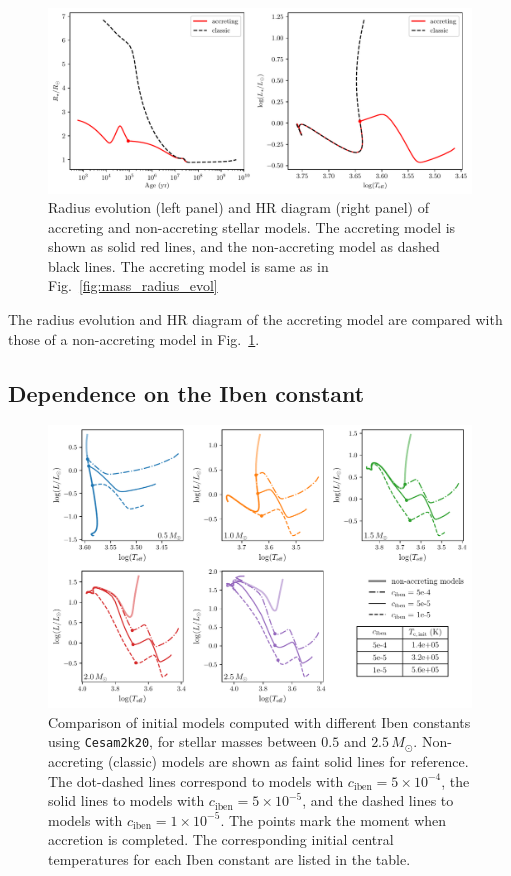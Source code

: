 \documentclass[12pt,a4paper]{article}
\newcommand{\mr}{\mathrm}
\begin{document}
\begin{figure}
  \centering
  \includegraphics[width=\textwidth,keepaspectratio]{m1_cmp_acc.pdf}
  \caption{Radius evolution (left panel) and HR diagram (right panel) of accreting and non-accreting stellar models. The accreting model is shown as solid red lines, and the non-accreting model as dashed black lines. The accreting model is same as in Fig.~\ref{fig:mass_radius_evol}}
  \label{fig:comp_accrete_non_accrete}
\end{figure}

The radius evolution and HR diagram of the accreting model are compared with those of a non-accreting model in Fig.~\ref{fig:comp_accrete_non_accrete}.  

\subsection{Dependence on the Iben constant}
\label{sec:initial_models}

\begin{figure}[htbp]
  \centering
  \includegraphics[width=\textwidth,keepaspectratio]{ciben_mass_init.pdf}
  \caption{Comparison of initial models computed with different Iben constants using \texttt{Cesam2k20}, for stellar masses between $0.5$ and $2.5\,M_\odot$. Non-accreting (classic) models are shown as faint solid lines for reference. The dot-dashed lines correspond to models with $c_\mr{iben} = 5\times10^{-4}$, the solid lines to models with $c_\mr{iben} = 5\times10^{-5}$, and the dashed lines to models with $c_\mr{iben} = 1\times10^{-5}$. The points mark the moment when accretion is completed. The corresponding initial central temperatures for each Iben constant are listed in the table.} 
  \label{fig:comp_iben}
\end{figure}
\end{document}
